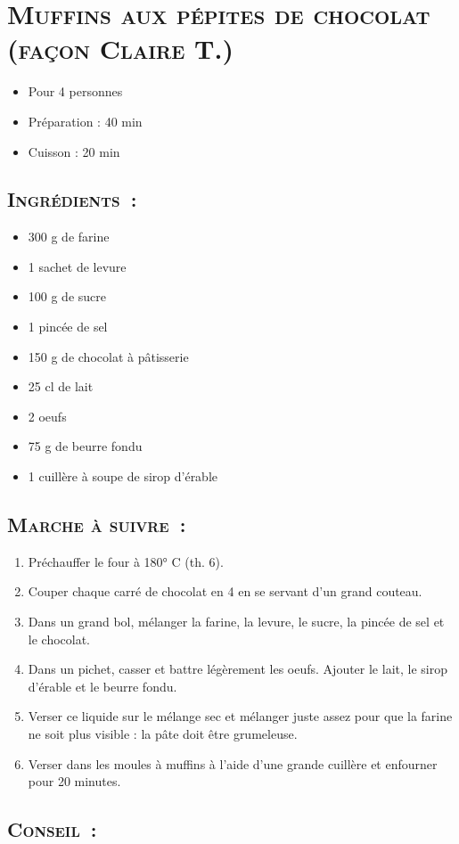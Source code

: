 \section[\normalsize{Muffins aux p\'epites de chocolat (fa\c con Claire T.)}]{\LARGE{\textsc{Muffins aux p\'epites de chocolat (fa\c con Claire T.)}}}		%


\begin{itemize}
\item Pour 4 personnes
\item Préparation : 40 min
\item Cuisson : 20 min
\end{itemize}

\subsection*{\textsc{Ingr\'edients~:}}

\begin{itemize}
\item 300 g de farine
\item 1 sachet de levure
\item 100 g de sucre
\item 1 pinc\'ee de sel
\item 150 g de chocolat \`a p\^atisserie
\item 25 cl de lait
\item 2 oeufs
\item 75 g de beurre fondu
\item 1 cuill\`ere \`a soupe de sirop d'\'erable
\end{itemize}


\subsection*{\textsc{Marche \`a suivre~:}}

\begin{enumerate}
\item Pr\'echauffer le four \`a 180° C (th. 6).
\item Couper chaque carr\'e de chocolat en 4 en se servant d'un grand couteau.
\item Dans un grand bol, m\'elanger la farine, la levure, le sucre, la pinc\'ee de sel et le chocolat.
\item Dans un pichet, casser et battre l\'eg\`erement les oeufs. Ajouter le lait, le sirop d'\'erable et le beurre fondu.
\item Verser ce liquide sur le m\'elange sec et m\'elanger juste assez pour que la farine ne soit plus visible : la p\^ate doit \^etre grumeleuse.
\item Verser dans les moules \`a muffins \`a l'aide d'une grande cuill\`ere et enfourner pour 20 minutes.
\end{enumerate}
\subsection*{\textsc{Conseil~:}}
